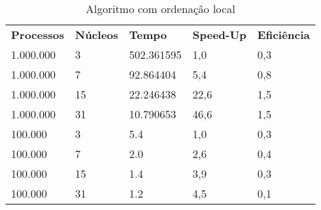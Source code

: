 \documentclass{acm_proc_article-sp}
\begin{document}
\begin{table}[]
\centering
\caption{Algoritmo com ordenação local}
\label{my-label}
\begin{tabular}{lllll}
\textbf{Processos} & \textbf{Núcleos} & \textbf{Tempo} & \textbf{Speed-Up} & \textbf{Eficiência} \\
1.000.000          & 3                & 502.361595     & 1,0               & 0,3                 \\
1.000.000          & 7                & 92.864404      & 5,4               & 0,8                 \\
1.000.000          & 15               & 22.246438      & 22,6              & 1,5                 \\
1.000.000          & 31               & 10.790653      & 46,6              & 1,5                 \\
100.000            & 3                & 5.4            & 1,0               & 0,3                 \\
100.000            & 7                & 2.0            & 2,6               & 0,4                 \\
100.000            & 15               & 1.4            & 3,9               & 0,3                 \\
100.000            & 31               & 1.2            & 4,5               & 0,1                
\end{tabular}
\end{table}




\end{document}
